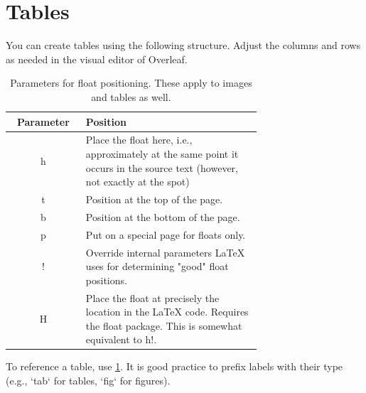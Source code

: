 \section{Tables}
You can create tables using the following structure. Adjust the columns and rows as needed in the visual editor of Overleaf.

\begin{table}[ht]
    \centering
    \begin{tabular}{|c|>{\centering\arraybackslash}p{0.7\linewidth}|}
        \hline 
        Parameter & Position \\ \hline 
        h & Place the float here, i.e., approximately at the same point it occurs in the source text (however, not exactly at the spot) \\ 
        t & Position at the top of the page. \\ 
        b & Position at the bottom of the page. \\ 
        p & Put on a special page for floats only. \\ 
        ! & Override internal parameters \LaTeX{} uses for determining "good" float positions. \\ 
        H & Place the float at precisely the location in the \LaTeX{} code. Requires the float package. This is somewhat equivalent to h!. \\ \hline
    \end{tabular}
    \caption{Parameters for float positioning. These apply to images and tables as well.}
    \label{tab:sometable}
\end{table}

To reference a table, use \ref{tab:sometable}. It is good practice to prefix labels with their type (e.g., `tab` for tables, `fig` for figures).


